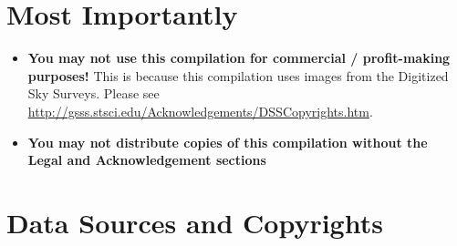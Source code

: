\section*{Most Importantly}
\begin{itemize}
\item \textbf{You may not use this compilation for commercial / profit-making
  purposes!}  This is because this compilation uses images from the
  Digitized Sky Surveys. Please see
  \url{http://gsss.stsci.edu/Acknowledgements/DSSCopyrights.htm}.
\item \textbf{You may not distribute copies of this compilation
  without the Legal and Acknowledgement sections}
\end{itemize}

\section*{Data Sources and Copyrights}
